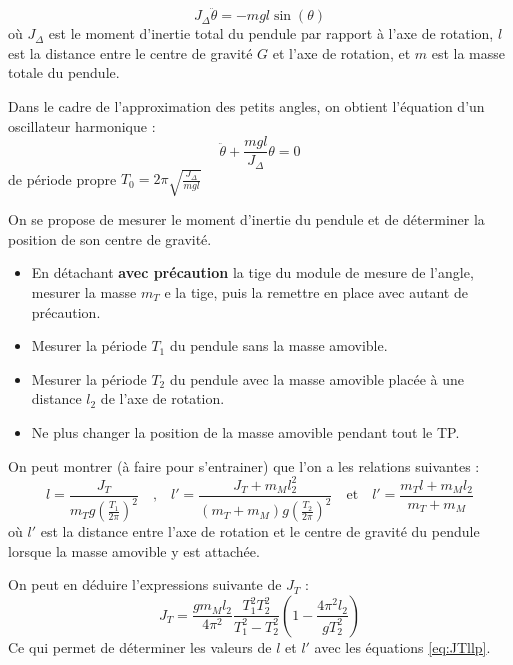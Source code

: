 \documentclass{tp}
\begin{document}
\begin{equation}
  J_\Delta \ddot{\theta} = -mgl \sin(\theta)
\end{equation}
%
où $J_\Delta$ est le moment d'inertie total du pendule par rapport à l'axe de rotation, $l$ est la distance entre le centre de gravité $G$ et l'axe de rotation, et $m$ est la masse totale du pendule.

Dans le cadre de l'approximation des petits angles, on obtient l'équation d'un oscillateur harmonique :
\begin{equation}
  \ddot{\theta} + \frac{mgl}{J_\Delta} \theta = 0
\end{equation}
de période propre $T_0 = 2\pi\sqrt{\frac{J_\Delta}{mgl}}$ 

On se propose de mesurer le moment d'inertie du pendule et de déterminer la position de son centre de gravité. 
\begin{itemize}
  \item En détachant \textbf{avec précaution} la tige du module de mesure de l'angle, mesurer la masse $m_T$ e la tige, puis la remettre en place avec autant de précaution.

  \item Mesurer la période $T_1$ du pendule sans la masse amovible.

  \item Mesurer la période $T_2$ du pendule avec la masse amovible placée à une distance $l_2$ de l'axe de rotation.

  \item Ne plus changer la position de la masse amovible pendant tout le TP.
\end{itemize}

On peut montrer (à faire pour s'entrainer) que l'on a les relations suivantes :
\begin{equation}
  l = \frac{J_T}{m_Tg \left(\frac{T_1}{2\pi}\right)^2} \quad \text{,} \quad 
  l' = \frac{J_T+m_Ml_2^2}{(m_T+m_M)g \left(\frac{T_2}{2\pi}\right)^2} \quad \text{et} \quad 
  l' = \frac{m_Tl + m_Ml_2}{m_T+m_M} \label{eq:JTllp}
\end{equation}
où $l'$ est la distance entre l'axe de rotation et le centre de gravité du pendule lorsque la masse amovible y est attachée.

On peut en déduire l'expressions suivante de $J_T$ :
\begin{equation}
  J_T = \frac{gm_Ml_2}{4\pi^2}\frac{T_1^2T_2^2}{T_1^2-T_2^2}\left( 1- \frac{4\pi^2l_2}{gT_2^2} \right)
\end{equation}
Ce qui permet de déterminer les valeurs de $l$ et $l'$ avec les équations \eqref{eq:JTllp}. 
\end{document}

